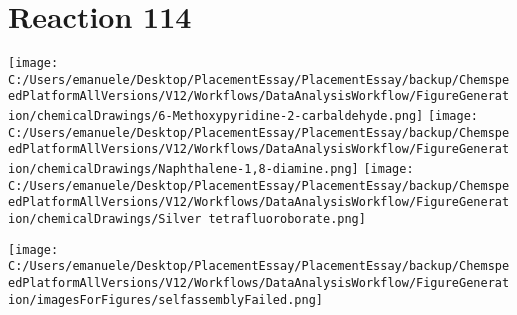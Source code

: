 \documentclass{article}%
\begin{document}
\section*{Reaction 114}%
%
\begin{scheme}[H]%
\begin{minipage}{0.5\textwidth}%
\texttt{[image: C:/Users/emanuele/Desktop/PlacementEssay/PlacementEssay/backup/ChemspeedPlatformAllVersions/V12/Workflows/DataAnalysisWorkflow/FigureGeneration/chemicalDrawings/6-Methoxypyridine-2-carbaldehyde.png]}%
\texttt{[image: C:/Users/emanuele/Desktop/PlacementEssay/PlacementEssay/backup/ChemspeedPlatformAllVersions/V12/Workflows/DataAnalysisWorkflow/FigureGeneration/chemicalDrawings/Naphthalene-1,8-diamine.png]}%
\texttt{[image: C:/Users/emanuele/Desktop/PlacementEssay/PlacementEssay/backup/ChemspeedPlatformAllVersions/V12/Workflows/DataAnalysisWorkflow/FigureGeneration/chemicalDrawings/Silver tetrafluoroborate.png]}%
\end{minipage}%
\begin{minipage}{0.5\textwidth}%
\begin{center}%
\texttt{[image: C:/Users/emanuele/Desktop/PlacementEssay/PlacementEssay/backup/ChemspeedPlatformAllVersions/V12/Workflows/DataAnalysisWorkflow/FigureGeneration/imagesForFigures/selfassemblyFailed.png]}%
\end{center}%
\end{minipage}%
\caption{Self-assembly of components 6, 21, with Silver(I) in a 3.0:1.5:1.0 molar ratio in CH$_3$CN at 60\textdegree C for 40h. These are the reagents (starting materials) for reaction 114.}%
\end{scheme}%
\end{document}
